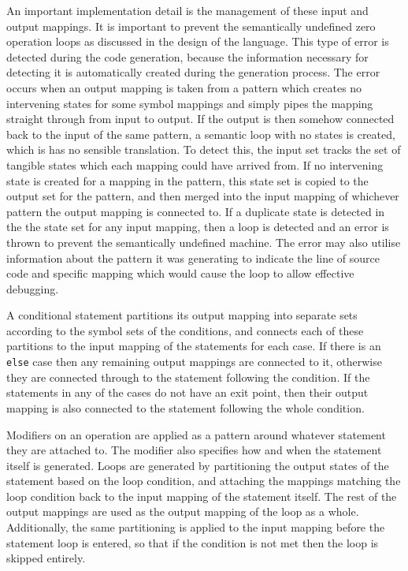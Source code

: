 \documentclass[11pt]{article}
\begin{document}
An important implementation detail is the management of these input and output mappings. It is important to prevent the semantically undefined zero operation loops as discussed in the design of the language. This type of error is detected during the code generation, because the information necessary for detecting it is automatically created during the generation process. The error occurs when an output mapping is taken from a pattern which creates no intervening states for some symbol mappings and simply pipes the mapping straight through from input to output. If the output is then somehow connected back to the input of the same pattern, a semantic loop with no states is created, which is has no sensible translation. To detect this, the input set tracks the set of tangible states which each mapping could have arrived from. If no intervening state is created for a mapping in the pattern, this state set is copied to the output set for the pattern, and then merged into the input mapping of whichever pattern the output mapping is connected to. If a duplicate state is detected in the the state set for any input mapping, then a loop is detected and an error is thrown to prevent the semantically undefined machine. The error may also utilise information about the pattern it was generating to indicate the line of source code and specific mapping which would cause the loop to allow effective debugging.

A conditional statement partitions its output mapping into separate sets according to the symbol sets of the conditions, and connects each of these partitions to the input mapping of the statements for each case. If there is an \texttt{else} case then any remaining output mappings are connected to it, otherwise they are connected through to the statement following the condition. If the statements in any of the cases do not have an exit point, then their output mapping is also connected to the statement following the whole condition.

Modifiers on an operation are applied as a pattern around whatever statement they are attached to. The modifier also specifies how and when the statement itself is generated. Loops are generated by partitioning the output states of the statement based on the loop condition, and attaching the mappings matching the loop condition back to the input mapping of the statement itself. The rest of the output mappings are used as the output mapping of the loop as a whole. Additionally, the same partitioning is applied to the input mapping before the statement loop is entered, so that if  the condition is not met then the loop is skipped entirely.
\end{document}
